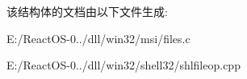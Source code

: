 该结构体的文档由以下文件生成\+:\begin{DoxyCompactItemize}
\item 
E\+:/\+React\+O\+S-\/0../dll/win32/msi/files.\+c\item 
E\+:/\+React\+O\+S-\/0../dll/win32/shell32/shlfileop.\+cpp\end{DoxyCompactItemize}
